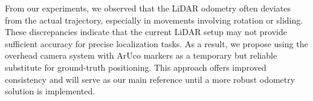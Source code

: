 From our experiments, we observed that the LiDAR odometry often deviates from the actual trajectory, especially in movements involving rotation or sliding. These discrepancies indicate that the current LiDAR setup may not provide sufficient accuracy for precise localization tasks. As a result, we propose using the overhead camera system with ArUco markers as a temporary but reliable substitute for ground-truth positioning. This approach offers improved consistency and will serve as our main reference until a more robust odometry solution is implemented.
